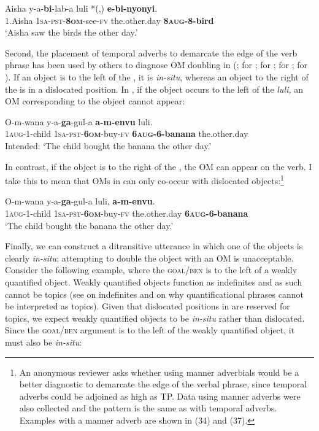 \documentclass[output=paper
,newtxmath
,modfonts
,nonflat]{langsci/langscibook}
\begin{document}
\ea\label{ex:ranero:10}
\gll Aisha    y-a-\textbf{bi}{}-lab-a        luli           *(,) \textbf{e-bi-nyonyi}.\\
1.Aisha \textsc{1sa-pst-}\textbf{\textsc{8om}}{}-see-\textsc{fv} the.other.day   {}  \textbf{8\textsc{aug}}\textbf{{}-8-bird}\\
\glt ‘Aisha saw the birds the other day.’
\z

Second, the placement of temporal adverbs to demarcate the edge of the verb phrase has been used by others to diagnose OM doubling in  (\citealt{Henderson2006}; \citealt{Riedel2009} for ; \citealt{bax2012} for ; \citealt{dierckstoappear} for ; \citealt{zeller2009,Zeller2015} for ). If an object is to the left of the , it is \textit{in-situ}, whereas an object to the right of the  is in a dislocated position. In , if the object occurs to the left of the  \textit{luli,} an OM corresponding to the object cannot appear:

\ea\label{ex:ranero:11}
\gll *O-m-wana    y-a-\textbf{ga}{}-gul-a               \textbf{a-m-envu}           luli.\\
1\textsc{aug}{}-1-child \textsc{1sa-pst-}\textbf{\textsc{6om}}{}-buy-\textsc{fv} \textbf{6\textsc{aug}}\textbf{{}-6-banana} the.other.day\\
\glt Intended: ‘The child bought the banana the other day.’
\z

In contrast, if the object is to the right of the , the OM can appear on the verb. I take this to mean that OMs in  can only co-occur with dislocated objects:\footnote{An anonymous reviewer asks whether using manner adverbials would be a better diagnostic to demarcate the edge of the verbal phrase, since temporal adverbs could be adjoined as high as TP. Data using manner adverbs were also collected and the pattern is the same as with temporal adverbs. Examples with a manner adverb are shown in (34) and (37).} 

\ea\label{ex:ranero:12}
\gll O-m-wana     y-a-\textbf{ga}{}-gul-a         luli,           \textbf{a-m-envu}.\\
1\textsc{aug}{}-1-child  \textsc{1sa-pst}{}-\textbf{\textsc{6om}}\textsc{{}-}buy-\textsc{fv}  the.other.day  \textbf{6\textsc{aug}}\textbf{{}-6-banana}\\
\glt ‘The child bought the banana the other day.’
\z

Finally, we can construct a ditransitive utterance in which one of the objects is clearly \textit{in-situ}; attempting to double the object with an OM is unacceptable. Consider the following example, where the \textsc{goal/ben} is to the left of a weakly quantified object. Weakly quantified objects function as indefinites and as such cannot be topics (see \citealt{Diesing1992} on indefinites and \citealt{Reinhart1981} on why quantificational phrases cannot be interpreted as topics). Given that dislocated positions in  are reserved for topics, we expect weakly quantified objects to be \textit{in-situ} rather than dislocated. Since the \textsc{goal/ben} argument is to the left of the weakly quantified object, it must also be \textit{in-situ}:
\end{document}
